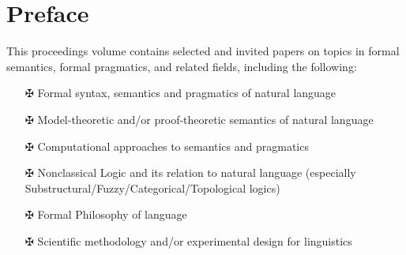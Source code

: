 \documentclass[12pt]{jarticle}
\begin{document}
\newpage

\vspace*{20cm}
\vfill
\begin{large}

\end{large}

\newpage
\pagestyle{plain}

\newpage
\section*{Preface}


This proceedings volume contains selected and invited papers on topics in formal semantics, formal pragmatics, and related fields, including the following:
\begin{itemize}
\item[$\maltese$] Formal syntax, semantics and pragmatics of natural language
\item[$\maltese$] Model-theoretic and/or proof-theoretic semantics of natural language
\item[$\maltese$] Computational approaches to semantics and pragmatics
\item[$\maltese$] Nonclassical Logic and its relation to natural language (especially Substructural/Fuzzy/Categorical/Topological logics)
\item[$\maltese$] Formal Philosophy of language
\item[$\maltese$] Scientific methodology and/or experimental design for linguistics
\end{itemize}



\vspace*{2.5cm}
\end{document}
